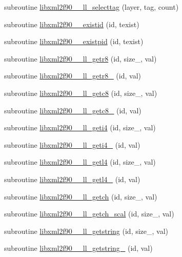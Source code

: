 \begin{DoxyCompactItemize}
subroutine \hyperlink{libxml2f90_8f90__pp_8f90_a82a4ef1569ea46506f400cf73fce7369}{libxml2f90\+\_\+\+\_\+ll\+\_\+selecttag} (layer, tag, count)
\item 
subroutine \hyperlink{libxml2f90_8f90__pp_8f90_aa7cbdbfe67d0ec6b1ce87ce016b6cb22}{libxml2f90\+\_\+\+\_\+existid} (id, texist)
\item 
subroutine \hyperlink{libxml2f90_8f90__pp_8f90_a6269f2e5870605109c32aadf4a17808c}{libxml2f90\+\_\+\+\_\+existpid} (id, texist)
\item 
subroutine \hyperlink{libxml2f90_8f90__pp_8f90_a8f48610de931b9ef342dadfd11a62da0}{libxml2f90\+\_\+\+\_\+ll\+\_\+getr8} (id, size\+\_\+, val)
\item 
subroutine \hyperlink{libxml2f90_8f90__pp_8f90_a77f33adc7fb009d5c2f4b8e5201c8f44}{libxml2f90\+\_\+\+\_\+ll\+\_\+getr8\+\_\+} (id, val)
\item 
subroutine \hyperlink{libxml2f90_8f90__pp_8f90_a5d4a74ac67abc4657d96bcc55fad78f3}{libxml2f90\+\_\+\+\_\+ll\+\_\+getc8} (id, size\+\_\+, val)
\item 
subroutine \hyperlink{libxml2f90_8f90__pp_8f90_a3cf0a08fd399cfb2380738008cc1523e}{libxml2f90\+\_\+\+\_\+ll\+\_\+getc8\+\_\+} (id, val)
\item 
subroutine \hyperlink{libxml2f90_8f90__pp_8f90_a90fdd12e3f7794c98317d1b08550f01f}{libxml2f90\+\_\+\+\_\+ll\+\_\+geti4} (id, size\+\_\+, val)
\item 
subroutine \hyperlink{libxml2f90_8f90__pp_8f90_a1c2a48ca65f77d8c56223d71e08ced37}{libxml2f90\+\_\+\+\_\+ll\+\_\+geti4\+\_\+} (id, val)
\item 
subroutine \hyperlink{libxml2f90_8f90__pp_8f90_a1b0c5cd537f12f2edf530cddaf84caf5}{libxml2f90\+\_\+\+\_\+ll\+\_\+getl4} (id, size\+\_\+, val)
\item 
subroutine \hyperlink{libxml2f90_8f90__pp_8f90_afb97bd01984f5df9ea5c58e09e719501}{libxml2f90\+\_\+\+\_\+ll\+\_\+getl4\+\_\+} (id, val)
\item 
subroutine \hyperlink{libxml2f90_8f90__pp_8f90_a6197ea91babb017cbc3cec50fe124c03}{libxml2f90\+\_\+\+\_\+ll\+\_\+getch} (id, size\+\_\+, val)
\item 
subroutine \hyperlink{libxml2f90_8f90__pp_8f90_ad30886dc2d259aec8eb502721e5347fc}{libxml2f90\+\_\+\+\_\+ll\+\_\+getch\+\_\+scal} (id, size\+\_\+, val)
\item 
subroutine \hyperlink{libxml2f90_8f90__pp_8f90_ab60330c194bfbef4790a34db8f896d24}{libxml2f90\+\_\+\+\_\+ll\+\_\+getstring} (id, size\+\_\+, val)
\item 
subroutine \hyperlink{libxml2f90_8f90__pp_8f90_a5a0b5cda999773856f04bc2047a3a95e}{libxml2f90\+\_\+\+\_\+ll\+\_\+getstring\+\_\+} (id, val)

\end{DoxyCompactItemize}

